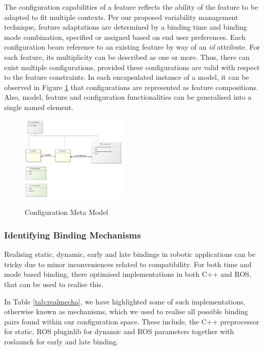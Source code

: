 \documentclass[conference]{IEEEtran}
\begin{document}
The configuration capabilities of a feature reflects the ability of the feature to be adapted to fit multiple contexts. Per our proposed variability management technique,
feature adaptations are determined by a binding time and binding mode combination, specified or assigned based on end user preferences. Each configuration bears reference to an existing feature by way of an \textit{id} attribute. For each feature, its multiplicity can be described as one or more. Thus, there can exist multiple configurations, provided these configurations are valid with respect to the feature constraints. In each encapsulated instance of a model, it can be observed in Figure \ref{conmet} that configurations are represented as feature compositions. Also, model, feature and configuration functionalities can be generalised into a single named element. 

\begin{figure}[H]
\caption{Configuration Meta Model}
\centering
\includegraphics[width=0.45\textwidth]{diagrams/config.png}
\label{conmet}
\end{figure}

\subsubsection{Identifying Binding Mechanisms}
Realising static, dynamic, early and late bindings in robotic applications can be tricky due to minor inconveniences related to compatibility. For both time and mode based binding, there optimised implementations in both C++ and ROS, that can be used to realise this.

In Table \ref{tab:realmecha}, we have highlighted some of such implementations, otherwise known as mechanisms, which we used to realise all possible binding pairs found within our configuration space. These include, the C++ preprocessor for static, ROS pluginlib for dynamic and ROS parameters together with roslaunch for early and late binding.
\end{document}
